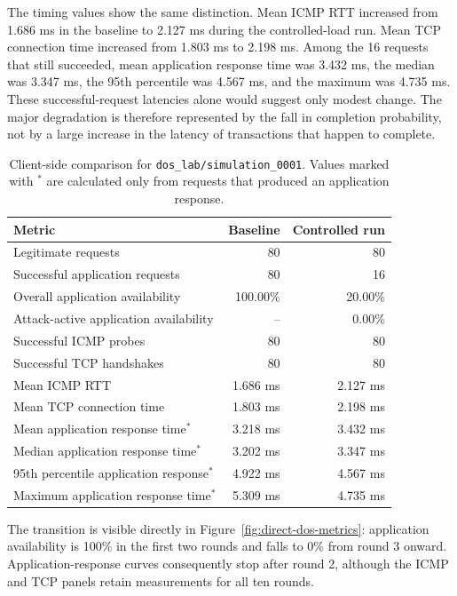The timing values show the same distinction. Mean ICMP RTT increased from
1.686 ms in the baseline to 2.127 ms during the controlled-load run. Mean TCP
connection time increased from 1.803 ms to 2.198 ms. Among the 16 requests that
still succeeded, mean application response time was 3.432 ms, the median was
3.347 ms, the 95th percentile was 4.567 ms, and the maximum was 4.735 ms.
These successful-request
latencies alone would suggest only modest change. The major degradation is
therefore represented by the fall in completion probability, not by a large
increase in the latency of transactions that happen to complete.

\begin{table}[htbp]
\centering
\small
\begin{tabular}{lrr}
\toprule
\textbf{Metric} & \textbf{Baseline} & \textbf{Controlled run} \\
\midrule
Legitimate requests & 80 & 80 \\
Successful application requests & 80 & 16 \\
Overall application availability & 100.00\% & 20.00\% \\
Attack-active application availability & -- & 0.00\% \\
Successful ICMP probes & 80 & 80 \\
Successful TCP handshakes & 80 & 80 \\
Mean ICMP RTT & 1.686 ms & 2.127 ms \\
Mean TCP connection time & 1.803 ms & 2.198 ms \\
Mean application response time$^{*}$ & 3.218 ms & 3.432 ms \\
Median application response time$^{*}$ & 3.202 ms & 3.347 ms \\
95th percentile application response$^{*}$ & 4.922 ms & 4.567 ms \\
Maximum application response time$^{*}$ & 5.309 ms & 4.735 ms \\
\bottomrule
\end{tabular}
\caption{Client-side comparison for \texttt{dos\_lab/simulation\_0001}. Values marked with $^{*}$ are calculated only from requests that produced an application response.}
\label{tab:client-comparison}
\end{table}

The transition is visible directly in
Figure~\ref{fig:direct-dos-metrics}: application availability is 100\% in the
first two rounds and falls to 0\% from round 3 onward. Application-response
curves consequently stop after round 2, although the ICMP and TCP panels retain
measurements for all ten rounds.

